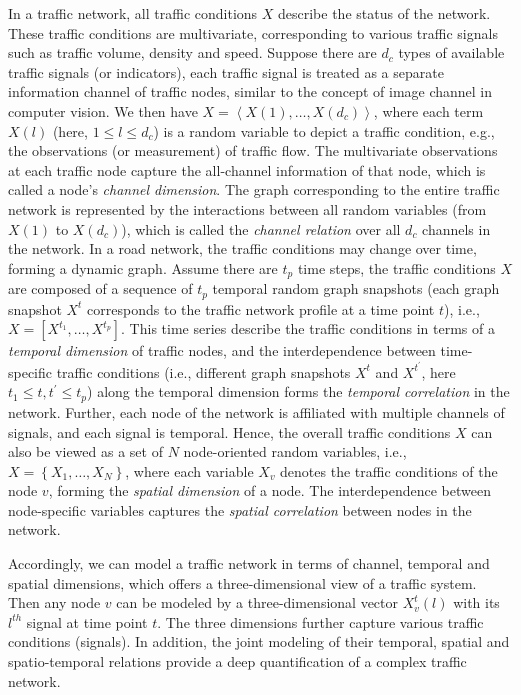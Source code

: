 In a traffic network, all traffic conditions $X$ describe the status of the network. These traffic conditions are multivariate, corresponding to various traffic signals such as traffic volume, density and speed. Suppose there are $d_c$ types of available traffic signals (or indicators), each traffic signal is treated as a separate information channel of traffic nodes, similar to the concept of image channel in computer vision. We then have $X=\left < X(1),\dots,X(d_c) \right >$, where each term $X(l)$ (here, $1 \leq l \leq d_c$) is a random variable to depict a traffic condition, e.g., the observations (or measurement) of traffic flow. The multivariate observations at each traffic node capture the all-channel information of that node, which is called a node’s \textit{channel dimension}. The graph corresponding to the entire traffic network is represented by the interactions between all random variables (from $X(1)$ to $X(d_c)$), which is called the \textit{channel relation} over all $d_c$ channels in the network. 
In a road network, the traffic conditions may change over time, forming a dynamic graph. Assume there are $t_p$ time steps, the traffic conditions $X$ are composed of a sequence of $t_p$ temporal random graph snapshots (each graph snapshot $X^{t}$ corresponds to the traffic network profile at a time point $t$), i.e., $X = [X^{t_1}, \dots , X^{t_p}]$. This time series describe the traffic conditions in terms of a \textit{temporal dimension} of traffic nodes, and the interdependence between time-specific traffic conditions (i.e., different graph snapshots $X^t$ and $X^{t^{'}}$, here $t_1 \leq t, t^{'} \leq t_p$) along the temporal dimension forms the \textit{temporal correlation}  in the network. 
Further, each node of the network is affiliated with multiple channels of signals, and each signal is temporal. Hence, the overall traffic conditions $X$ can also be viewed as a set of $N$ node-oriented random variables, i.e., $X = \left\{X_1, \dots , X_N\right\}$, where each variable $X_v$ denotes the traffic conditions of the node $v$, forming the \textit{spatial dimension} of a node. The interdependence between node-specific variables captures the \textit{spatial correlation} between nodes in the network.  

Accordingly, we can model a traffic network in terms of channel, temporal and spatial dimensions, which offers a three-dimensional view of a traffic system. Then any node $v$ can be modeled by a three-dimensional vector $X_v^{t}(l)$ with its $l^{th}$ signal at time point $t$. The three dimensions further capture various traffic conditions (signals). In addition, the joint modeling of their temporal, spatial and spatio-temporal relations provide a deep quantification of a complex traffic network. 

